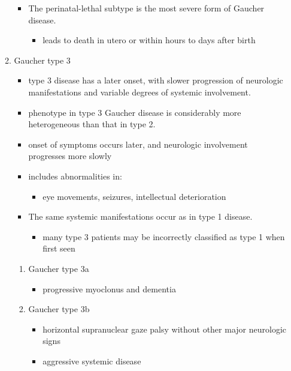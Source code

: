 \documentclass{scrartcl}
\begin{document}
\begin{enumerate}
\begin{enumerate}
\begin{itemize}
\item The perinatal-lethal subtype is the most severe form of Gaucher
disease.
\begin{itemize}
\item leads to death in utero or within hours to days after
birth
\end{itemize}
\end{itemize}

\item Gaucher type 3
\label{sec:org589a011}
\begin{itemize}
\item type 3 disease has a later onset, with slower progression of
neurologic manifestations and variable degrees of systemic
involvement.
\item phenotype in type 3 Gaucher disease is considerably more
heterogeneous than that in type 2.

\item onset of symptoms occurs later, and neurologic involvement
progresses more slowly

\item includes abnormalities in:
\begin{itemize}
\item eye movements, seizures, intellectual deterioration
\end{itemize}

\item The same systemic manifestations occur as in type 1 disease.
\begin{itemize}
\item many type 3 patients may be incorrectly classified as type 1 when
first seen
\end{itemize}
\end{itemize}

\begin{enumerate}
\item Gaucher type 3a
\label{sec:orgedfdf6c}
\begin{itemize}
\item progressive myoclonus and dementia
\end{itemize}

\item Gaucher type 3b
\label{sec:org2b1ce6a}
\begin{itemize}
\item horizontal supranuclear gaze palsy without other major
neurologic signs
\item aggressive systemic disease
\end{itemize}


\end{enumerate}
\end{enumerate}
\end{enumerate}
\end{document}
